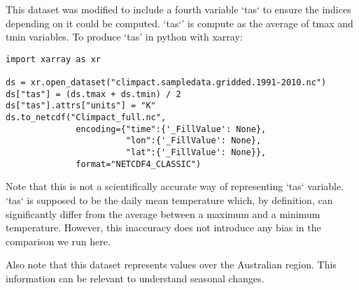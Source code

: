 \documentclass[a4paper,11pt]{article}
\begin{document}
        This dataset was modified to include a fourth variable `tas` to ensure the indices depending on it could be computed.
        `tas`' is compute as the average of tmax and tmin variables.
        To produce `tas' in python with xarray:
        \begin{minipage}{\linewidth}
        \begin{lstlisting}
import xarray as xr

ds = xr.open_dataset("climpact.sampledata.gridded.1991-2010.nc")
ds["tas"] = (ds.tmax + ds.tmin) / 2
ds["tas"].attrs["units"] = "K"
ds.to_netcdf("Climpact_full.nc",
              encoding={"time":{'_FillValue': None},
                        "lon":{'_FillValue': None},
                        "lat":{'_FillValue': None}},
              format="NETCDF4_CLASSIC")
        \end{lstlisting}
        \end{minipage}

        Note that this is not a scientifically accurate way of representing `tas` variable.
        `tas` is supposed to be the daily mean temperature which, by definition, can significantly differ from the average between a maximum and a minimum temperature.
        However, this inaccuracy does not introduce any bias in the comparison we run here.

        Also note that this dataset represents values over the Australian region. This information can be relevant to understand seasonal changes.
\end{document}
